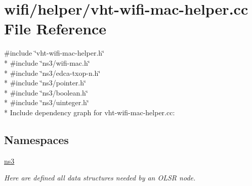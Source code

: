 \hypertarget{vht-wifi-mac-helper_8cc}{}\section{wifi/helper/vht-\/wifi-\/mac-\/helper.cc File Reference}
\label{vht-wifi-mac-helper_8cc}
{\ttfamily \#include \char`\"{}vht-\/wifi-\/mac-\/helper.\+h\char`\"{}}\\*
{\ttfamily \#include \char`\"{}ns3/wifi-\/mac.\+h\char`\"{}}\\*
{\ttfamily \#include \char`\"{}ns3/edca-\/txop-\/n.\+h\char`\"{}}\\*
{\ttfamily \#include \char`\"{}ns3/pointer.\+h\char`\"{}}\\*
{\ttfamily \#include \char`\"{}ns3/boolean.\+h\char`\"{}}\\*
{\ttfamily \#include \char`\"{}ns3/uinteger.\+h\char`\"{}}\\*
Include dependency graph for vht-\/wifi-\/mac-\/helper.cc\+:
\subsection*{Namespaces}
\begin{DoxyCompactItemize}
\item 
 \hyperlink{namespacens3}{ns3}
\begin{DoxyCompactList}\small\item\em Here are defined all data structures needed by an O\+L\+SR node. \end{DoxyCompactList}\end{DoxyCompactItemize}
